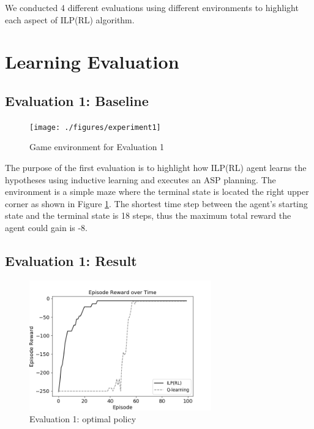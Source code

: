 We conducted 4 different evaluations using different environments to highlight each aspect of ILP(RL) algorithm.
\section{Learning Evaluation}
\label{sec:learning_evaluation}

\subsection{Evaluation 1: Baseline}
\label{subsec:experiement1_setup}

\begin{figure}[!htb]
\centering
\texttt{[image: ./figures/experiment1]}
\caption{Game environment for Evaluation 1}
\label{fig:experiment1}
\end{figure}
    
The purpose of the first evaluation is to highlight how ILP(RL) agent learns the hypotheses using inductive learning and executes an ASP planning.
The environment is a simple maze where the terminal state is located the right upper corner as shown in Figure \ref{fig:experiment1}.
The shortest time step between the agent's starting state and the terminal state is 18 steps, thus the maximum total reward the agent could gain is -8.

\subsection{Evaluation 1: Result}
\label{subsec:experiment1_result}

\begin{figure}[!htb]
\centering
\includegraphics[width=0.7\textwidth]{./figures/experiment1_test}
\caption{Evaluation 1: optimal policy }
\label{experiment1_result}
\end{figure}

